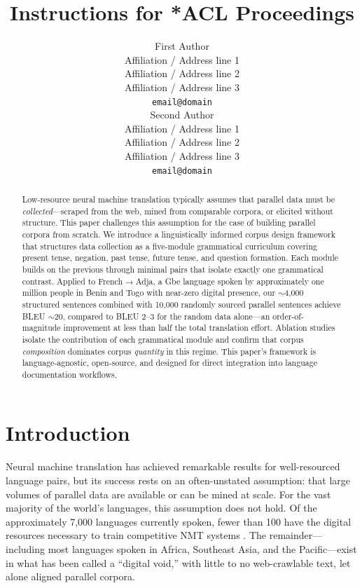\documentclass[11pt]{article}
\title{Instructions for *ACL Proceedings}
\author{First Author \\
  Affiliation / Address line 1 \\
  Affiliation / Address line 2 \\
  Affiliation / Address line 3 \\
  \texttt{email@domain} \\\And
  Second Author \\
  Affiliation / Address line 1 \\
  Affiliation / Address line 2 \\
  Affiliation / Address line 3 \\
  \texttt{email@domain} \\}
\begin{document}
\maketitle
\begin{abstract}
Low-resource neural machine translation typically assumes that parallel data must be \emph{collected}---scraped from the web, mined from comparable corpora, or elicited without structure. This paper challenges this assumption for the case of building parallel corpora from scratch. We introduce a linguistically informed corpus design framework that structures data collection as a five-module grammatical curriculum covering present tense, negation, past tense, future tense, and question formation. Each module builds on the previous through minimal pairs that isolate exactly one grammatical contrast. Applied to French$\rightarrow$Adja, a Gbe language spoken by approximately one million people in Benin and Togo with near-zero digital presence, our ${\sim}$4,000 structured sentences combined with 10,000 randomly sourced parallel sentences achieve BLEU ${\sim}$20, compared to BLEU 2--3 for the random data alone---an order-of-magnitude improvement at less than half the total translation effort. Ablation studies isolate the contribution of each grammatical module and confirm that corpus \emph{composition} dominates corpus \emph{quantity} in this regime. This paper's framework is language-agnostic, open-source, and designed for direct integration into language documentation workflows.
\end{abstract}

\section{Introduction}
\label{sec:introduction}

Neural machine translation has achieved remarkable results for well-resourced language pairs, but its success rests on an often-unstated assumption: that large volumes of parallel data are available or can be mined at scale. For the vast majority of the world's languages, this assumption does not hold. Of the approximately 7,000 languages currently spoken, fewer than 100 have the digital resources necessary to train competitive NMT systems \cite{joshi-etal-2020-state}. The remainder---including most languages spoken in Africa, Southeast Asia, and the Pacific---exist in what has been called a ``digital void,'' with little to no web-crawlable text, let alone aligned parallel corpora.
\end{document}
